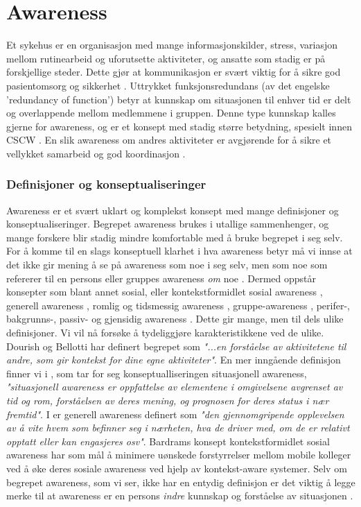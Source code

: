 \section{Awareness}
\label{chp: awareness}

Et sykehus er en organisasjon med mange informasjonskilder, stress, variasjon mellom rutinearbeid og uforutsette aktiviteter, og ansatte som stadig er på forskjellige steder. Dette gjør at kommunikasjon er svært viktig for å sikre god pasientomsorg og sikkerhet \cite{Klemets12}. Uttrykket funksjonsredundans (av det engelske 'redundancy of function') betyr at kunnskap om situasjonen til enhver tid er delt og overlappende mellom medlemmene i gruppen\cite{KlemetsRedundancy}. Denne type kunnskap kalles gjerne for awareness, og er et konsept med stadig større betydning, spesielt innen CSCW \cite{Dourish92}. En slik awareness om andres aktiviteter er avgjørende for å sikre et vellykket samarbeid og god koordinasjon \cite{KlemetsRedundancy}. 

\subsubsection{Definisjoner og konseptualiseringer}
Awareness er et svært uklart og komplekst konsept med mange definisjoner og konseptualiseringer\cite{KlemetsRedundancy, Gutwin04, Schmidt02}. Begrepet awareness brukes i utallige sammenhenger, og mange forskere blir stadig mindre komfortable med å bruke begrepet i seg selv. For å komme til en slags konseptuell klarhet i hva awareness betyr må vi innse at det ikke gir mening å se på awareness som noe i seg selv, men som noe som refererer til en persons eller gruppes awareness \emph{om} noe \cite{Schmidt02}. Dermed oppstår konsepter som blant annet sosial, eller kontekstformidlet sosial awareness \cite{Bardram04}, generell awareness \cite{Gross13}, romlig og tidsmessig awareness \cite{Randell}, gruppe-awareness \cite{Gutwin04}, perifer-, bakgrunns-, passiv- og gjensidig awareness \cite{Schmidt02}. Dette gir mange, men til dels ulike definisjoner. Vi vil nå forsøke å tydeliggjøre karakteristikkene ved de ulike. Dourish og Bellotti har definert begrepet som \emph{"...en forståelse av aktivitetene til andre, som gir kontekst for dine egne aktiviteter"}. En mer inngående definisjon finner vi i \cite{Endsly95}, som tar for seg konseptualliseringen situasjonell awareness, \emph{"situasjonell awareness er oppfattelse av elementene i omgivelsene avgrenset av tid og rom, forståelsen av deres mening, og prognosen for deres status i nær fremtid"}. I \cite{Gross13} er generell awareness definert som \emph{"den gjennomgripende opplevelsen av å vite hvem som befinner seg i nærheten, hva de driver med, om de er relativt opptatt eller kan engasjeres osv"}. Bardrams konsept kontekstformidlet sosial awareness har som mål å minimere uønskede forstyrrelser mellom mobile kolleger ved å øke deres sosiale awareness ved hjelp av kontekst-aware systemer\cite{Bardram04}. Selv om begrepet awareness, som vi ser, ikke har en entydig definisjon er det viktig å legge merke til at awareness er en persons \emph{indre} kunnskap og forståelse av situasjonen \cite{Gross13}. 

